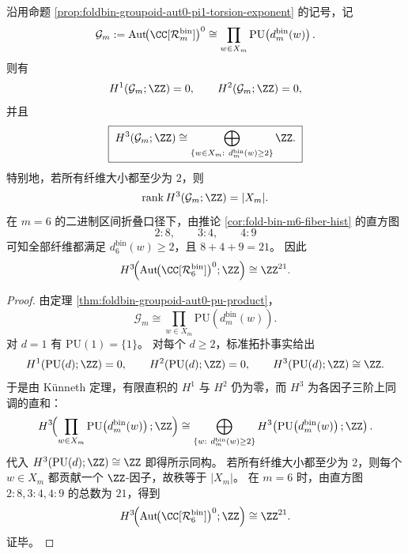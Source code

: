 \begin{theorem}[连通自同构群的三阶整上同调秩由纤维数完全决定]\label{thm:foldbin-groupoid-aut0-third-cohomology-rank}
沿用命题 \ref{prop:foldbin-groupoid-aut0-pi1-torsion-exponent} 的记号，记
\[
\mathcal G_m:=\mathrm{Aut}\!\bigl(\CC[\mathcal{R}_m^{\mathrm{bin}}]\bigr)^0
\cong
\prod_{w\in X_m}\mathrm{PU}\!\left(d_m^{\mathrm{bin}}(w)\right).
\]
则有
\[
H^1(\mathcal G_m;\ZZ)=0,
\qquad
H^2(\mathcal G_m;\ZZ)=0,
\]
并且
\[
\boxed{\;
H^3(\mathcal G_m;\ZZ)
\cong
\bigoplus_{\{w\in X_m:\ d_m^{\mathrm{bin}}(w)\ge 2\}}\ZZ.\;}
\]
特别地，若所有纤维大小都至少为 \(2\)，则
\[
\operatorname{rank}H^3(\mathcal G_m;\ZZ)=|X_m|.
\]
在 \(m=6\) 的二进制区间折叠口径下，由推论 \ref{cor:fold-bin-m6-fiber-hist} 的直方图
\[
2:8,\qquad 3:4,\qquad 4:9
\]
可知全部纤维都满足 \(d_6^{\mathrm{bin}}(w)\ge 2\)，且 \(8+4+9=21\)。
因此
\[
H^3\!\Bigl(\mathrm{Aut}\!\bigl(\CC[\mathcal{R}_6^{\mathrm{bin}}]\bigr)^0;\ZZ\Bigr)
\cong
\ZZ^{21}.
\]
\end{theorem}
\begin{proof}
由定理 \ref{thm:foldbin-groupoid-aut0-pu-product}，
\[
\mathcal G_m\cong \prod_{w\in X_m}\mathrm{PU}\!\left(d_m^{\mathrm{bin}}(w)\right).
\]
对 \(d=1\) 有 \(\mathrm{PU}(1)=\{1\}\)。
对每个 \(d\ge 2\)，标准拓扑事实给出
\[
H^1(\mathrm{PU}(d);\ZZ)=0,
\qquad
H^2(\mathrm{PU}(d);\ZZ)=0,
\qquad
H^3(\mathrm{PU}(d);\ZZ)\cong \ZZ.
\]
于是由 K\"unneth 定理，有限直积的 \(H^1\) 与 \(H^2\) 仍为零，而 \(H^3\) 为各因子三阶上同调的直和：
\[
H^3\!\Bigl(\prod_{w\in X_m}\mathrm{PU}\!\left(d_m^{\mathrm{bin}}(w)\right);\ZZ\Bigr)
\cong
\bigoplus_{\{w:\ d_m^{\mathrm{bin}}(w)\ge 2\}}
H^3\!\left(\mathrm{PU}\!\left(d_m^{\mathrm{bin}}(w)\right);\ZZ\right).
\]
代入 \(H^3(\mathrm{PU}(d);\ZZ)\cong\ZZ\) 即得所示同构。
若所有纤维大小都至少为 \(2\)，则每个 \(w\in X_m\) 都贡献一个 \(\ZZ\)-因子，故秩等于 \(|X_m|\)。
在 \(m=6\) 时，由直方图 \(2:8,3:4,4:9\) 的总数为 \(21\)，得到
\[
H^3\!\Bigl(\mathrm{Aut}\!\bigl(\CC[\mathcal{R}_6^{\mathrm{bin}}]\bigr)^0;\ZZ\Bigr)\cong \ZZ^{21}.
\]
证毕。
\end{proof}

